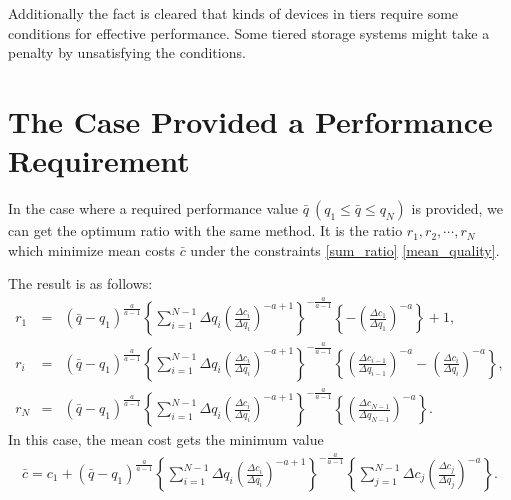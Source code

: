 \documentclass[a4paper,11pt]{article}
\begin{document}
Additionally the fact is cleared that kinds of devices in tiers require
some conditions for effective performance.
Some tiered storage systems might take a penalty by unsatisfying the
conditions.


\appendix

\section{The Case Provided a Performance Requirement}

In the case where a required performance value
$\bar{q}\ (q_1 \leq \bar{q} \leq q_N)$ is provided, we can get the
optimum ratio with the same method. It is the ratio
$r_1,r_2,\cdots,r_N$ which minimize mean costs $\bar{c}$ under the
constraints \eqref{sum_ratio} \eqref{mean_quality}.


The result is as follows:
\begin{eqnarray}
  r_1 &=& \left(\bar{q}-q_1\right)^\frac{a}{a-1}
    \left\{\sum_{i=1}^{N-1}\Delta q_i\left(\frac{\Delta c_i}{\Delta
      q_i}\right)^{-a+1}\right\}^{-\frac{a}{a-1}}
    \left\{-\left(\frac{\Delta c_1}{\Delta q_1}\right)^{-a}\right\} +
    1, \label{r1_q} \\
  r_i &=& \left(\bar{q}-q_1\right)^\frac{a}{a-1}
    \left\{\sum_{i=1}^{N-1}\Delta q_i\left(\frac{\Delta c_i}{\Delta
            q_i}\right)^{-a+1}\right\}^{-\frac{a}{a-1}}
    \left\{\left(\frac{\Delta c_{i-1}}{\Delta q_{i-1}}\right)^{-a}
    -\left(\frac{\Delta c_i}{\Delta q_i}\right)^{-a}\right\},
  \label{ri_q}\\
  r_N &=& \left(\bar{q}-q_1\right)^\frac{a}{a-1}
  \left\{\sum_{i=1}^{N-1}\Delta q_i\left(\frac{\Delta c_i}{\Delta
          q_i}\right)^{-a+1}\right\}^{-\frac{a}{a-1}}
  \left\{\left(\frac{\Delta c_{N-1}}{\Delta
    q_{N-1}}\right)^{-a}\right\}.
  \label{rN_q}
\end{eqnarray}
In this case, the mean cost gets the minimum value
\begin{eqnarray}
  \bar{c} = c_1 + \left(\bar{q}-q_1\right)^\frac{a}{a-1}
    \left\{\sum_{i=1}^{N-1}\Delta q_i\left(
      \frac{\Delta c_i}{\Delta q_i}\right)^{-a+1}\right\}^{-\frac{a}{a-1}}
    \left\{\sum_{j=1}^{N-1}\Delta c_j \left(
      \frac{\Delta c_{j}}{\Delta q_{j}}\right)^{-a}\right\}.
\end{eqnarray}
\end{document}
